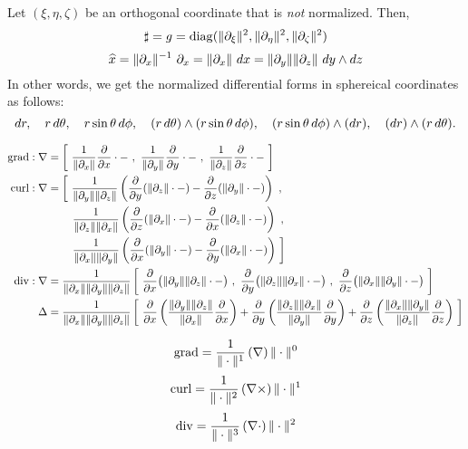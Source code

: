 \documentclass[11pt]{article}
\begin{document}
Let $(\xi,\eta,\zeta)$ be an orthogonal coordinate that is \emph{not} normalized.
Then,
\[\sharp=g=\diag(\|\pd_\xi\|^2,\|\pd_\eta\|^2,\|\pd_\zeta\|^2)\]
\[\hat x=\|\pd_x\|^{-1}\ \pd_x=\|\pd_x\|\ dx=\|\pd_y\|\|\pd_z\|\ dy\wdg dz\]
In other words, we get the normalized differential forms in sphereical coordinates as follows:
\[dr,\quad r\,d\theta,\quad r\sin\theta\,d\phi,\quad(r\,d\theta)\wedge(r\sin\theta\,d\phi),\quad(r\sin\theta\,d\phi)\wedge(dr),\quad(dr)\wedge(r\,d\theta).\]

\begin{align*}
\grad:\del&=\left[\ \frac1{\|\pd_x\|}\pd{x}\cdot-\ ,\ \frac1{\|\pd_y\|}\pd{y}\cdot-\ ,\ \frac1{\|\pd_z\|}\pd{z}\cdot-\ \right]\\
\curl:\del&=\left[\ \frac1{\|\pd_y\|\|\pd_z\|}\left(\pd{y}(\|\pd_z\|\cdot-)-\pd{z}(\|\pd_y\|\cdot-)\right)\ ,\right.\\
&\qquad\left.\frac1{\|\pd_z\|\|\pd_x\|}\left(\pd{z}(\|\pd_x\|\cdot-)-\pd{x}(\|\pd_z\|\cdot-)\right)\ ,\right.\\
&\qquad\left.\frac1{\|\pd_x\|\|\pd_y\|}\left(\pd{x}(\|\pd_y\|\cdot-)-\pd{y}(\|\pd_x\|\cdot-)\right)\ \right]\\
\div:\del&=\frac1{\|\pd_x\|\|\pd_y\|\|\pd_z\|}\left[\ \pd{x}\bigl(\|\pd_y\|\|\pd_z\|\cdot-\bigr)\ ,\ \pd{y}\bigl(\|\pd_z\|\|\pd_x\|\cdot-\bigr)\ ,\ \pd{z}\bigl(\|\pd_x\|\|\pd_y\|\cdot-\bigr)\ \right]\\
\Delta&=\frac1{\|\pd_x\|\|\pd_y\|\|\pd_z\|}\left[\ \pd{x}\left(\frac{\|\pd_y\|\|\pd_z\|}{\|\pd_x\|}\pd{x}\right)+\pd{y}\left(\frac{\|\pd_z\|\|\pd_x\|}{\|\pd_y\|}\pd{y}\right)+\pd{z}\left(\frac{\|\pd_x\|\|\pd_y\|}{\|\pd_z\|}\pd{z}\right)\ \right]
\end{align*}

\bigskip

\[\operatorname{grad}=\frac1{\|\cdot\|^1}\,(\nabla)\,\|\cdot\|^0\]
\[\operatorname{curl}=\frac1{\|\cdot\|^2}\,(\nabla\times)\,\|\cdot\|^1\]
\[\operatorname{div}=\frac1{\|\cdot\|^3}\,(\nabla\cdot)\,\|\cdot\|^2\]
\end{document}
